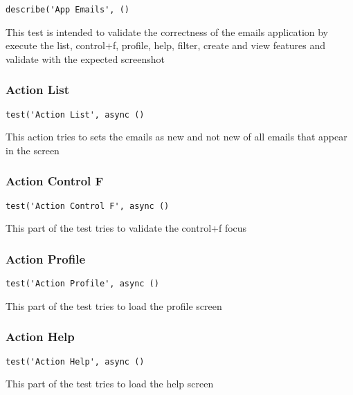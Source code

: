 \documentclass[a4paper]{article}
\begin{document}
\begin{lstlisting}
describe('App Emails', ()
\end{lstlisting}

This test is intended to validate the correctness of the emails application by
execute the list, control+f, profile, help, filter, create and view features and
validate with the expected screenshot

\hypertarget{toc138}{}
\subsubsection{Action List}

\begin{lstlisting}
test('Action List', async ()
\end{lstlisting}

This action tries to sets the emails as new and not new of all emails that
appear in the screen

\hypertarget{toc139}{}
\subsubsection{Action Control F}

\begin{lstlisting}
test('Action Control F', async ()
\end{lstlisting}

This part of the test tries to validate the control+f focus

\hypertarget{toc140}{}
\subsubsection{Action Profile}

\begin{lstlisting}
test('Action Profile', async ()
\end{lstlisting}

This part of the test tries to load the profile screen

\hypertarget{toc141}{}
\subsubsection{Action Help}

\begin{lstlisting}
test('Action Help', async ()
\end{lstlisting}

This part of the test tries to load the help screen
\end{document}
